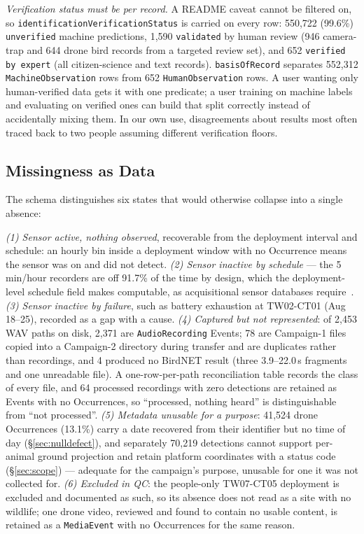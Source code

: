 \documentclass[sigconf]{acmart}
\begin{document}
\emph{Verification status must be per record.} A README caveat cannot be
filtered on, so \texttt{identification\allowbreak Verification\allowbreak Status} is carried on
every row: 550{,}722 (99.6\%) \texttt{unverified} machine predictions,
1{,}590 \texttt{validated} by human review (946 camera-trap and 644
drone bird records from a targeted review set), and 652
\texttt{verified by expert} (all citizen-science and text records).
\texttt{basisOfRecord} separates 552{,}312 \texttt{MachineObservation}
rows from 652 \texttt{HumanObservation} rows. A user wanting only
human-verified data gets it with one predicate; a user training on
machine labels and evaluating on verified ones can build that split
correctly instead of accidentally mixing them. In our own use, disagreements about
results most often traced back to two people assuming different
verification floors.

\subsection{Missingness as Data}

The schema distinguishes six states that would otherwise collapse into a
single absence:

\emph{(1) Sensor active, nothing observed}, recoverable from the
deployment interval and schedule: an hourly bin inside a deployment
window with no Occurrence means the sensor was on and did not detect.
\emph{(2) Sensor inactive by schedule} --- the 5\,min/hour recorders are
off 91.7\% of the time by design, which the deployment-level schedule
field makes computable, as acquisitional sensor
databases require~\cite{madden2005tinydb}. \emph{(3) Sensor inactive by failure}, such as
battery exhaustion at TW02-CT01 (Aug 18--25), recorded as a gap with a
cause. \emph{(4) Captured but not represented}: of 2{,}453 WAV paths on
disk, 2{,}371 are \texttt{AudioRecording} Events; 78 are Campaign-1
files copied into a Campaign-2 directory during transfer and are
duplicates rather than recordings, and 4 produced no BirdNET result
(three 3.9--22.0\,s fragments and one unreadable file). A one-row-per-path
reconciliation table records the class of every file, and 64 processed
recordings with zero detections are retained as Events with no
Occurrences, so ``processed, nothing heard'' is distinguishable from
``not processed''.
\emph{(5) Metadata unusable for a purpose}: 41{,}524 drone Occurrences
(13.1\%) carry a date recovered from their identifier but no time of
day (\S\ref{sec:nulldefect}), and separately
70{,}219 detections cannot support per-animal ground projection and
retain platform coordinates with a status code (\S\ref{sec:scope}) ---
adequate for the campaign's purpose, unusable for one it was not
collected for. \emph{(6) Excluded in QC}: the people-only TW07-CT05
deployment is excluded and documented as such, so its absence does not
read as a site with no wildlife; one drone video, reviewed and found to
contain no usable content, is retained as a \texttt{MediaEvent} with no
Occurrences for the same reason.
\end{document}
